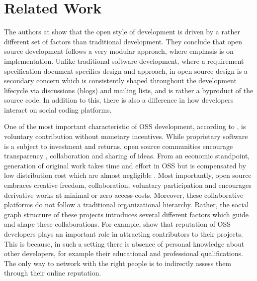 
\section{Related Work}
\label{sec:related}

The authors at \cite{LlanosC12} show that the open style of development is driven by a rather different set of factors than traditional development. They conclude that open source development follows a very modular approach, where emphasis is on implementation. Unlike traditional software development, where a requirement specification document specifies design and approach, in open source design is a secondary concern which is consistently shaped throughout the development lifecycle via discussions (blogs) and mailing lists, and is rather a byproduct of the source code. In addition to this, there is also a difference in how developers interact on social coding platforms.

One of the most important characteristic of OSS development, according to \cite{Hippel2003}, is voluntary contribution without monetary incentives. While proprietary software is a subject to investment and returns, open source communities encourage transparency \cite{Dabbish2012}, collaboration and sharing of ideas. From an economic standpoint, generation of original work takes time and effort in OSS but is compensated by low distribution cost which are almost negligible \cite{Lerner2002}. Most importantly, open source embraces creative freedom, collaboration, voluntary participation and encourages derivative works at minimal or zero access costs. Moreover, these collaborative platforms do not follow a traditional organizational hierarchy. Rather, the social graph structure of these projects introduces several different factors which guide and shape these collaborations. For example, \cite{Lerner2002} \cite{Raymond1998} show that reputation of OSS developers plays an important role in attracting contributors to their projects. This is because, in such a setting there is absence of personal knowledge about other developers, for example their educational and professional qualifications. The only way to network with the right people is to indirectly assess them through their online reputation.

